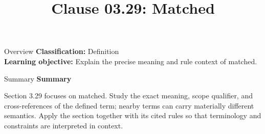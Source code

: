 \documentclass[10pt,letterpaper]{article}
\title{Clause 03.29: Matched}
\author{}
\date{}
\begin{document}
\maketitle
\begin{CornellOverviewBox}{Overview}
\textbf{Classification:} Definition\\[2pt]
\textbf{Learning objective:} Explain the precise meaning and rule context of matched.
\end{CornellOverviewBox}\begin{CornellSummaryBox}{Summary}
{\sffamily\bfseries\color{Accent} Summary}\par\vspace{3pt}Section 3.29 focuses on matched. Study the exact meaning, scope qualifier, and cross-references of the defined term; nearby terms can carry materially different semantics. Apply the section together with its cited rules so that terminology and constraints are interpreted in context.
\end{CornellSummaryBox}
\end{document}
